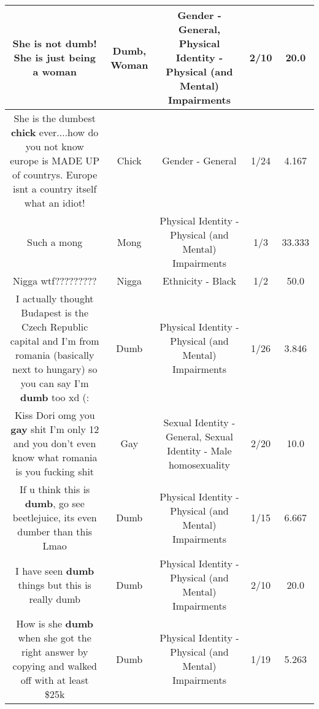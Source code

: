 \documentclass[11pt]{article}
\newlength\mylength
\begin{document}
\begin{center}
\begin{longtable}{|C{.65\mylength}|C{.30\mylength}|C{.12\mylength}|C{.12\mylength}|C{.12\mylength}|}
  \small She is not \textbf{dumb}! She is just being a woman\normalsize   & Dumb, Woman & Gender - General, Physical Identity - Physical (and Mental) Impairments & 2/10 & 20.0 \\  \hline
  \small She is the dumbest \textbf{chick} ever....how do you not know europe is MADE UP of countrys. Europe isnt a country itself what an idiot!\normalsize   & Chick & Gender - General & 1/24 & 4.167 \\  \hline
  \small Such a mong\normalsize   & Mong & Physical Identity - Physical (and Mental) Impairments & 1/3 & 33.333 \\  \hline
  \small Nigga wtf?????????\normalsize   & Nigga & Ethnicity - Black & 1/2 & 50.0 \\  \hline
  \small I actually thought Budapest is the Czech Republic capital and I'm from romania (basically next to hungary) so you can say I'm \textbf{dumb} too xd (:\normalsize   & Dumb & Physical Identity - Physical (and Mental) Impairments & 1/26 & 3.846 \\  \hline
  \small Kiss Dori omg you \textbf{g\textbf{ay}} shit I'm only 12 and you don't even know what romania is you fucking shit\normalsize   & Gay & Sexual Identity - General, Sexual Identity - Male homosexuality & 2/20 & 10.0 \\  \hline
  \small If u think this is \textbf{dumb}, go see beetlejuice,  its even dumber than this Lmao\normalsize   & Dumb & Physical Identity - Physical (and Mental) Impairments & 1/15 & 6.667 \\  \hline
  \small I have seen \textbf{dumb} things but this is really dumb\normalsize   & Dumb & Physical Identity - Physical (and Mental) Impairments & 2/10 & 20.0 \\  \hline
  \small How is she \textbf{dumb} when she got the right answer by copying and walked off with at least \$25k\normalsize   & Dumb & Physical Identity - Physical (and Mental) Impairments & 1/19 & 5.263 \\  \hline

\end{longtable}
\end{center}
\end{document}
